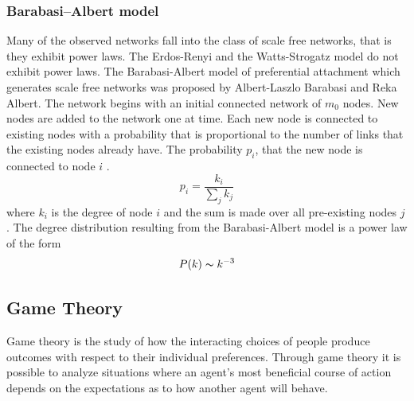 \documentclass[runningheads]{llncs}
\begin{document}
\subsubsection{Barabasi–Albert model}
Many of the observed networks fall into the class of scale free networks, that is they exhibit power laws. The Erdos-Renyi and the Watts-Strogatz model do not exhibit power laws. The Barabasi-Albert model of preferential attachment which generates scale free networks was proposed by Albert-Laszlo Barabasi and Reka Albert. The network begins with an initial connected network of $m_0$ nodes. New nodes are added to the network one at time. Each new node is connected to existing nodes with a probability that is proportional to the number of links that the existing nodes already have. The probability $p_i$, that the new node is connected to node $i$ .
\begin{equation}
    p_i = \frac{k_i}{\sum_{j} k_j}
\end{equation}
where $k_i$ is the degree of node $i$ and the sum is made over all pre-existing nodes $j$. The degree distribution resulting from the Barabasi-Albert model is a power law of the form \begin{equation}
    P(k) \thicksim k^{-3}
\end{equation}
\subsection{Game Theory}
Game theory is the study of how the interacting choices of people produce outcomes with respect to their individual preferences. Through game theory it is possible to analyze situations where an agent’s most beneficial course of action depends on the expectations as to how another agent will behave. 
\end{document}
